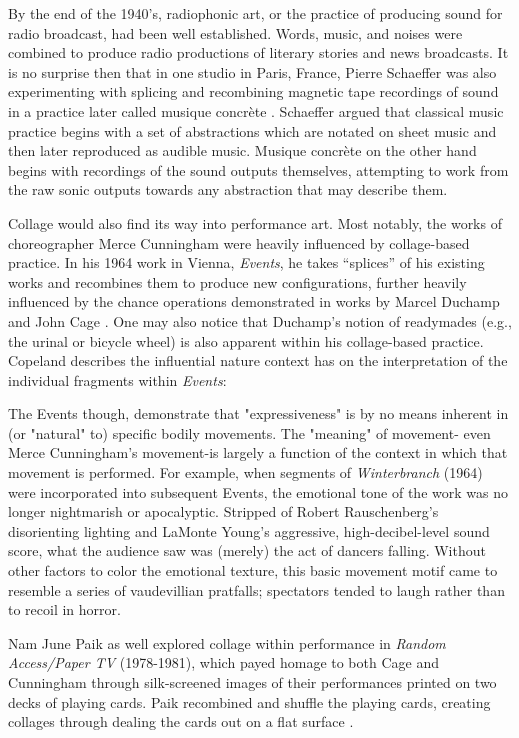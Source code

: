 \documentclass[a4paper,10pt,final]{ThesisStyle}
\begin{document}
By the end of the 1940's, radiophonic art, or the practice of producing sound for radio broadcast, had been well established.  Words, music, and noises were combined to produce radio productions of literary stories and news broadcasts.  It is no surprise then that in one studio in Paris, France, Pierre Schaeffer was also experimenting with splicing and recombining magnetic tape recordings of sound in a practice later called musique concr\`ete \cite{}.  Schaeffer argued that classical music practice begins with a set of abstractions which are notated on sheet music and then later reproduced as audible music.  Musique concr\`ete on the other hand begins with recordings of the sound outputs themselves, attempting to work from the raw sonic outputs towards any abstraction that may describe them.  \cite{SonicExperience}

Collage would also find its way into performance art.  Most notably, the works of choreographer Merce Cunningham were heavily influenced by collage-based practice.  In his 1964 work in Vienna, \textit{Events}, he takes ``splices'' of his existing works and recombines them to produce new configurations, further heavily influenced by the chance operations demonstrated in works by Marcel Duchamp and John Cage \cite{Copeland2002}.  One may also notice that Duchamp's notion of readymades (e.g., the urinal or bicycle wheel) is also apparent within his collage-based practice.  Copeland describes the influential nature context has on the interpretation of the individual fragments within \textit{Events}:
\begin{quotationb}
The Events though, demonstrate that "expressiveness" is by no means inherent in (or "natural" to) specific bodily movements. The "meaning" of movement- even Merce Cunningham's movement-is largely a function of the context in which that movement is performed. For example, when segments of \textit{Winterbranch} (1964) were incorporated into subsequent Events, the emotional tone of the work was no longer nightmarish or apocalyptic. Stripped of Robert Rauschenberg's disorienting lighting and LaMonte Young's aggressive, high-decibel-level sound score, what the audience saw was (merely) the act of dancers falling. Without other factors to color the emotional texture, this basic movement motif came to resemble a series of vaudevillian pratfalls; spectators tended to laugh rather than to recoil in horror.
\end{quotationb}
Nam June Paik as well explored collage within performance in \textit{Random Access/Paper TV} (1978-1981), which payed homage to both Cage and Cunningham through silk-screened images of their performances printed on two decks of playing cards.  Paik recombined and shuffle the playing cards, creating collages through dealing the cards out on a flat surface \cite{Copeland2002}.
\end{document}
